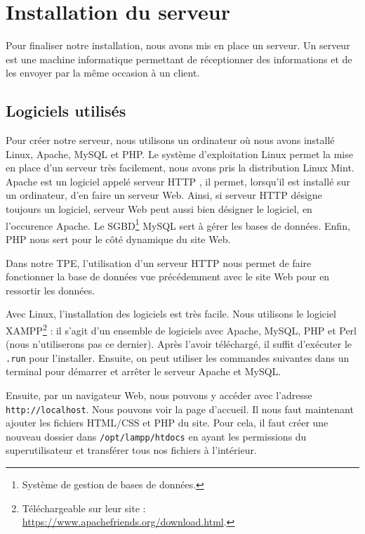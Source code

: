 \chapter{Installation du serveur}
\label{chapitre:serveur}

Pour finaliser notre installation, nous avons mis en place un serveur. Un serveur est une machine informatique permettant de réceptionner des informations et de les envoyer par la même occasion à un client.

\section{Logiciels utilisés}
\label{section:logiciels}

Pour créer notre serveur, nous utilisons un ordinateur où nous avons installé Linux, Apache, MySQL et PHP. Le système d'exploitation Linux permet la mise en place d'un serveur très facilement, nous avons pris la distribution Linux Mint. Apache est un logiciel appelé \og serveur HTTP \fg, il permet, lorsqu'il est installé sur un ordinateur, d'en faire un serveur Web. Ainsi, si \og serveur HTTP \fg{} désigne toujours un logiciel, \og serveur Web \fg{} peut aussi bien désigner le logiciel, en l'occurence Apache. Le SGBD\footnote{Système de gestion de bases de données.} MySQL sert à gérer les bases de données. Enfin, PHP nous sert pour le côté dynamique du site Web.

Dans notre TPE, l'utilisation d'un serveur HTTP nous permet de faire fonctionner la base de données vue précédemment avec le site Web pour en ressortir les données.

\Espace

Avec Linux, l'installation des logiciels est très facile. Nous utilisons le logiciel XAMPP\footnote{Téléchargeable sur leur site : \url{https://www.apachefriends.org/download.html}.} : il s'agit d'un ensemble de logiciels avec Apache, MySQL, PHP et Perl (nous n'utiliserons pas ce dernier). Après l'avoir téléchargé, il suffit d'exécuter le \verb-.run- pour l'installer. Ensuite, on peut utiliser les commandes suivantes dans un terminal pour démarrer et arrêter le serveur Apache et MySQL.


Ensuite, par un navigateur Web, nous pouvons y accéder avec l'adresse \verb-http://localhost-. Nous pouvons voir la page d'accueil. Il nous faut maintenant ajouter les fichiers HTML/CSS et PHP du site. Pour cela, il faut créer une nouveau dossier dans \verb-/opt/lampp/htdocs- en ayant les permissions du superutilisateur et transférer tous nos fichiers à l'intérieur.

